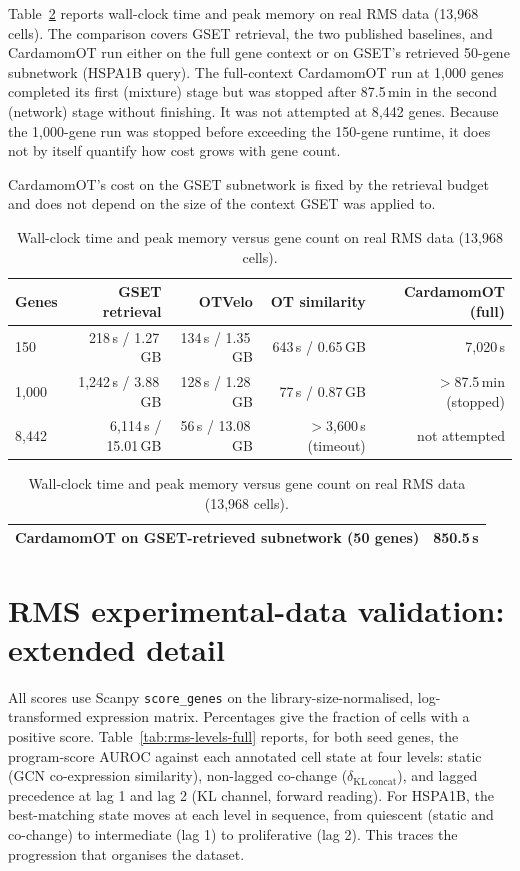 \documentclass[10pt, letterpaper]{article}
\begin{document}
Table~\ref{tab:scalability} reports wall-clock time and peak memory on real RMS data (13{,}968 cells). The comparison covers GSET retrieval, the two published baselines, and CardamomOT run either on the full gene context or on GSET's retrieved 50-gene subnetwork (HSPA1B query). The full-context CardamomOT run at 1{,}000 genes completed its first (mixture) stage but was stopped after 87.5\,min in the second (network) stage without finishing. It was not attempted at 8{,}442 genes. Because the 1{,}000-gene run was stopped before exceeding the 150-gene runtime, it does not by itself quantify how cost grows with gene count.

CardamomOT's cost on the GSET subnetwork is fixed by the retrieval budget and does not depend on the size of the context GSET was applied to.

\begin{table}[H]
\centering
\caption{Wall-clock time and peak memory versus gene count on real RMS data (13{,}968 cells).}
\begin{tabular}{lrrrr}
\toprule
Genes & GSET retrieval & OTVelo & OT similarity & CardamomOT (full) \\
\midrule
150      & 218\,s / 1.27\,GB     & 134\,s / 1.35\,GB & 643\,s / 0.65\,GB  & 7{,}020\,s \\
1{,}000  & 1{,}242\,s / 3.88\,GB & 128\,s / 1.28\,GB & 77\,s / 0.87\,GB   & $>$87.5\,min (stopped) \\
8{,}442  & 6{,}114\,s / 15.01\,GB& 56\,s / 13.08\,GB & $>$3{,}600\,s (timeout) & not attempted \\
\bottomrule
\end{tabular}

\vspace{0.3cm}

\begin{tabular}{lr}
\toprule
CardamomOT on GSET-retrieved subnetwork (50 genes) & 850.5\,s \\
\bottomrule
\end{tabular}
\label{tab:scalability}
\end{table}

\section{RMS experimental-data validation: extended detail}
\label{app:rms-validation}

All scores use Scanpy \texttt{score\_genes} on the library-size-normalised, log-transformed expression matrix. Percentages give the fraction of cells with a positive score. Table~\ref{tab:rms-levels-full} reports, for both seed genes, the program-score AUROC against each annotated cell state at four levels: static (GCN co-expression similarity), non-lagged co-change ($\delta_{\mathrm{KL\,concat}}$), and lagged precedence at lag 1 and lag 2 (KL channel, forward reading). For HSPA1B, the best-matching state moves at each level in sequence, from quiescent (static and co-change) to intermediate (lag 1) to proliferative (lag 2). This traces the progression that organises the dataset. 
\end{document}
